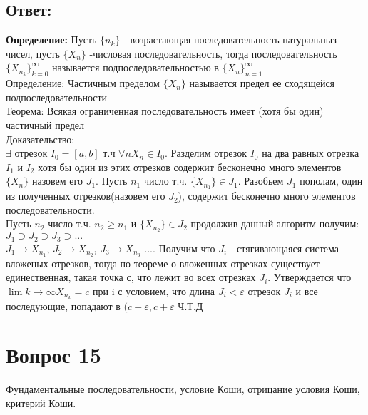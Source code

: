 \documentclass{article}
\begin{document}
\subsection*{Ответ:}
\textbf{Определение:} Пусть $\{n_k\}$ - возрастающая последовательность натуральныз чисел, пусть $\{X_n\}$ -числовая последовательность, тогда последовательность  $\{X_{n_k}\}^{\infty} _{k=0}$ называется
подпоследовательностью в $\{X_{n}\}^{\infty} _{n=1}$\\
Определение: Частичным пределом $\{X_{n}\}$ называется предел ее сходящейся подпоследовательности\\
Теорема: Всякая ограниченная последовательность имеет (хотя бы один) частичный предел\\
Доказательство:\\
$\exists$ отрезок $I_0 = [a,b]$ т.ч $\forall n X_n \in I_0$. Разделим отрезок $I_0$ на два равных отрезка $I_1$ и $I_2$
хотя бы один из этих отрезков содержит бесконечно много элементов $\{X_{n}\} $ назовем его $J_1$. Пусть $n_1$ число т.ч.
$\{X_{n_1}\} \in J_1$. Разобьем $J_1$ пополам, один  из полученных отрезков(назовем его $J_2$), содержит бесконечно много элементов последовательности.\\
Пусть $n_2$ число т.ч. $n_2 \geq n_1$ и $\{X_{n_2}\} \in J_2$ продолжив данный алгоритм получим:
$ J_1 \supset J_2 \supset J_3 \supset ...$\\
$ J_1 \rightarrow X_{n_1}$, $J_2 \rightarrow X_{n_2}$, $J_3 \rightarrow X_{n_3}$ .... \:
Получим что $J_i$ - стягивающаяся система вложеных отрезков, тогда по теореме о вложенных отрезках существует единественная, такая точка с, что лежит во всех отрезках $J_i$.
Утверждается что $\lim\limits{k \to \infty} X_{n_k} = c$
при i с условием, что длина $J_i < \varepsilon$ отрезок $J_i$ и все последующие, попадают в
$(c - \varepsilon,c+\varepsilon$ Ч.Т.Д
\section*{Вопрос 15}
\begin{center}
Фундаментальные последовательности, условие Коши, отрицание условия Коши, критерий Коши.
\end{center}
\end{document}
